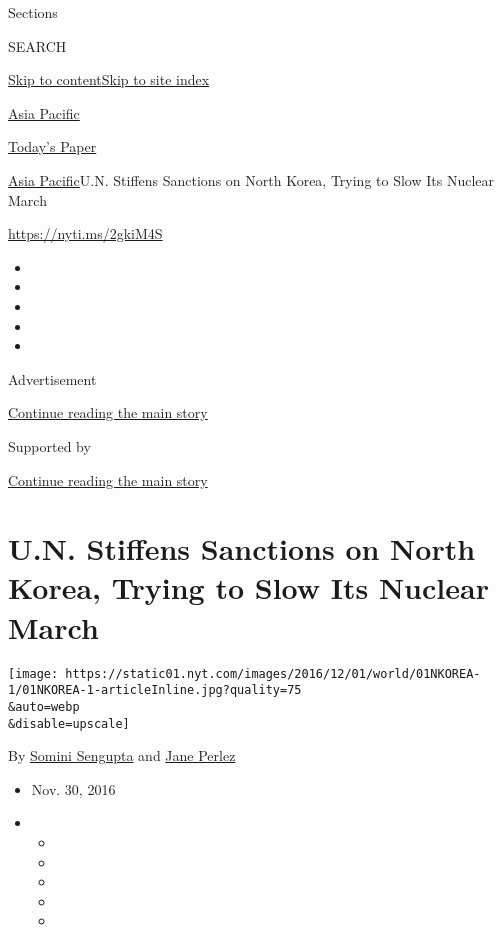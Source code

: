 Sections

SEARCH

\protect\hyperlink{site-content}{Skip to
content}\protect\hyperlink{site-index}{Skip to site index}

\href{https://www.nytimes.com/section/world/asia}{Asia Pacific}

\href{https://myaccount.nytimes.com/auth/login?response_type=cookie\&client_id=vi}{}

\href{https://www.nytimes.com/section/todayspaper}{Today's Paper}

\href{/section/world/asia}{Asia Pacific}\textbar{}U.N. Stiffens
Sanctions on North Korea, Trying to Slow Its Nuclear March

\url{https://nyti.ms/2gkiM4S}

\begin{itemize}
\item
\item
\item
\item
\item
\end{itemize}

Advertisement

\protect\hyperlink{after-top}{Continue reading the main story}

Supported by

\protect\hyperlink{after-sponsor}{Continue reading the main story}

\hypertarget{un-stiffens-sanctions-on-north-korea-trying-to-slow-its-nuclear-march}{%
\section{U.N. Stiffens Sanctions on North Korea, Trying to Slow Its
Nuclear
March}\label{un-stiffens-sanctions-on-north-korea-trying-to-slow-its-nuclear-march}}

\texttt{[image: https://static01.nyt.com/images/2016/12/01/world/01NKOREA-1/01NKOREA-1-articleInline.jpg?quality=75\\\&auto=webp\\\&disable=upscale]}

By \href{http://www.nytimes.com/by/somini-sengupta}{Somini Sengupta} and
\href{http://www.nytimes.com/by/jane-perlez}{Jane Perlez}

\begin{itemize}
\item
  Nov. 30, 2016
\item
  \begin{itemize}
  \item
  \item
  \item
  \item
  \item
  \end{itemize}
\end{itemize}

